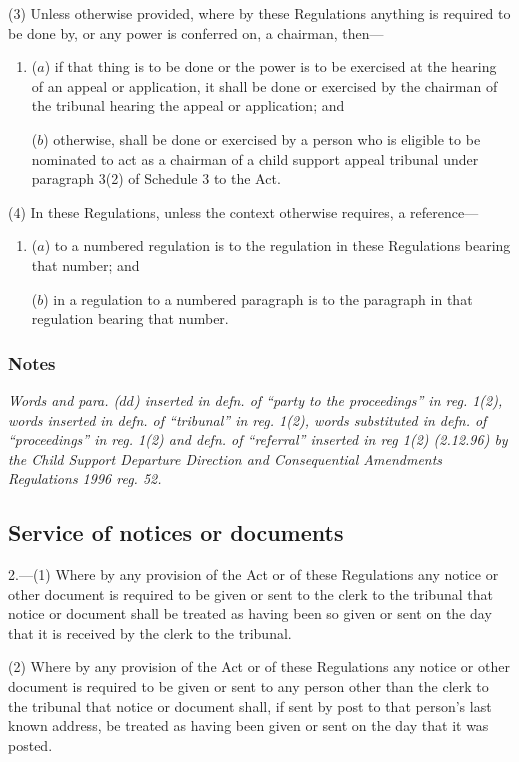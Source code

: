 \documentclass[a4paper]{article}
\newcommand\amendment[1]{\subsubsection*{Notes}{\itshape\frenchspacing\footnotesize #1 \par}}
\begin{document}
(3) Unless otherwise provided, where by these Regulations anything is required to be done by, or any power is conferred on, a chairman, then---
\begin{enumerate}\item[]
($a$) if that thing is to be done or the power is to be exercised at the hearing of an appeal or application, it shall be done or exercised by the chairman of the tribunal hearing the appeal or application; and

($b$) otherwise, shall be done or exercised by a person who is eligible to be nominated to act as a chairman of a child support appeal tribunal under paragraph 3(2) of Schedule 3 to the Act.
\end{enumerate}

(4) In these Regulations, unless the context otherwise requires, a reference---
\begin{enumerate}\item[]
($a$) to a numbered regulation is to the regulation in these Regulations bearing that number; and

($b$) in a regulation to a numbered paragraph is to the paragraph in that regulation bearing that number.
\end{enumerate}

\amendment{
Words and para. ($dd$) inserted in defn. of ``party to the proceedings'' in reg. 1(2), words inserted in defn. of ``tribunal'' in reg. 1(2), words substituted in defn. of ``proceedings'' in reg. 1(2) and defn. of ``referral'' inserted in reg 1(2) (2.12.96) by the Child Support Departure Direction and Consequential Amendments Regulations 1996 reg. 52.
}

\subsection[2. Service of notices or documents]{Service of notices or documents}

2.—(1) Where by any provision of the Act or of these Regulations any notice or other document is required to be given or sent to the clerk to the tribunal that notice or document shall be treated as having been so given or sent on the day that it is received by the clerk to the tribunal.

(2) Where by any provision of the Act or of these Regulations any notice or other document is required to be given or sent to any person other than the clerk to the tribunal that notice or document shall, if sent by post to that person’s last known address, be treated as having been given or sent on the day that it was posted.
\end{document}
